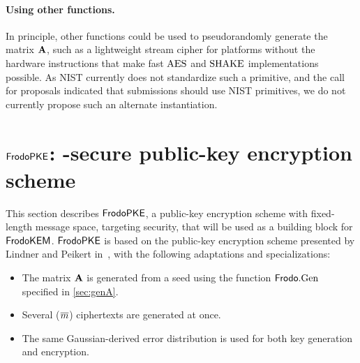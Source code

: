 \documentclass{iacrcc}
\begin{document}
\paragraph{Using other functions.}
In principle, other functions could be used to pseudorandomly generate the matrix $\mathbf{A}$, such as a lightweight stream cipher for platforms without the hardware instructions that make fast $\textrm{\upshape\mdseries AES}$ and $\textrm{\upshape\mdseries SHAKE}$ implementations possible.  As NIST currently does not standardize such a primitive, and the call for proposals indicated that submissions should use NIST primitives, we do not currently propose such an alternate instantiation.

\section{$\textsf{\upshape\mdseries FrodoPKE}$: \INDCPA-secure public-key encryption scheme}\label{sec:cpa-pke}

This section describes $\textsf{\upshape\mdseries FrodoPKE}$, a public-key encryption scheme
with fixed-length message space, targeting \INDCPA security, that will
be used as a building block for $\textsf{\upshape\mdseries FrodoKEM}$. $\textsf{\upshape\mdseries FrodoPKE}$ is based on
the public-key encryption scheme presented by Lindner and Peikert
in~\cite{RSA:LinPei11}, with the following adaptations and
specializations:
\begin{itemize}
\item The matrix $\mathbf{A}$ is generated from a seed using the function $\textsf{\upshape\mdseries Frodo}.\textrm{\upshape\mdseries Gen}$ specified in \autoref{sec:genA}.
\item Several ($\overline{m}$) ciphertexts are generated at once.
\item The same Gaussian-derived error distribution is used for both
  key generation and encryption.
\end{itemize}
\end{document}
